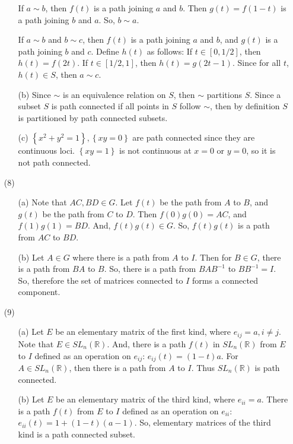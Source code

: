 \documentclass[12pt]{article}
\begin{document}
\begin{itemize}
\begin{itemize}
If $a \sim b$, then $f(t)$ is a path joining $a$ and $b$. Then $g(t) = f(1 - t)$ is a path joining $b$ and $a$. So, $b \sim a$.

If $a \sim b$ and $b \sim c$, then $f(t)$ is a path joining $a$ and $b$, and $g(t)$ is a path joining $b$ and $c$. Define $h(t)$ as follows: If $t \in [0, 1/2]$, then $h(t) = f(2t)$. If $t \in [1/2, 1]$, then $h(t) = g(2t - 1)$. Since for all $t$, $h(t) \in S$, then $a \sim c$.
\item[(b)]
Since $\sim$ is an equivalence relation on $S$, then $\sim$ partitions $S$. Since a subset $S$ is path connected if all points in $S$ follow $\sim$, then by definition $S$ is partitioned by path connected subsets.
\item[(c)]
$\left\lbrace x^2 + y^2 = 1 \right\rbrace, \left\lbrace xy = 0 \right\rbrace$ are path connected since they are continuous loci. $\left\lbrace xy = 1 \right\rbrace$ is not continuous at $x = 0$ or $y = 0$, so it is not path connected.
\end{itemize}
\item[(8)]
\begin{itemize}
\item[(a)]
Note that $AC, BD \in G$. Let $f(t)$ be the path from $A$ to $B$, and $g(t)$ be the path from $C$ to $D$. Then $f(0)g(0) = AC$, and $f(1)g(1) = BD$. And, $f(t)g(t) \in G$. So, $f(t)g(t)$ is a path from $AC$ to $BD$.
\item[(b)]
Let $A \in G$ where there is a path from $A$ to $I$. Then for $B \in G$, there is a path from $BA$ to $B$. So, there is a path from $BAB^{-1}$ to $BB^{-1} = I$. So, therefore the set of matrices connected to $I$ forms a connected component.
\end{itemize}
\item[(9)]
\begin{itemize}
\item[(a)]
Let $E$ be an elementary matrix of the first kind, where $e_{ij} = a, i \neq j$. Note that $E \in SL_n(\mathbb{R})$. And, there is a path $f(t)$ in $SL_n(\mathbb{R})$ from $E$ to $I$ defined as an operation on $e_{ij}$: $e_{ij}(t) = (1 - t)a$. For $A \in SL_n(\mathbb{R})$, then there is a path from $A$ to $I$. Thus $SL_n(\mathbb{R})$ is path connected.
\item[(b)]
Let $E$ be an elementary matrix of the third kind, where $e_{ii} = a$. There is a path $f(t)$ from $E$ to $I$ defined as an operation on $e_{ii}$: $e_{ii}(t) = 1 + (1 - t)(a - 1)$. So, elementary matrices of the third kind is a path connected subset.


\end{itemize}
\end{itemize}
\end{document}

